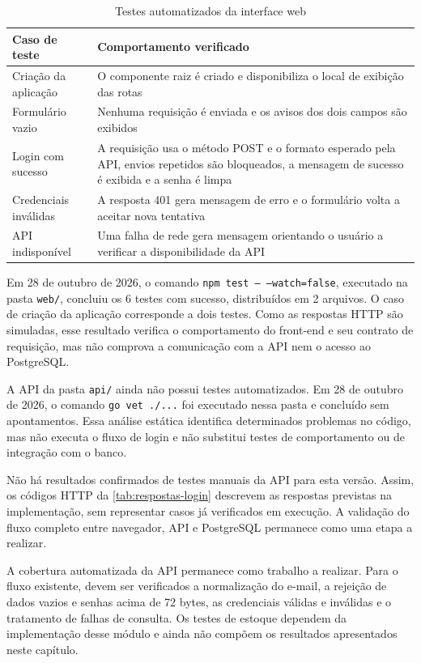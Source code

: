 \begin{table}[htbp]
  \centering
  \caption{Testes automatizados da interface web}
  \label{tab:testes-web}
  \begin{tabularx}{\textwidth}{XX}
    \toprule
    \textbf{Caso de teste} & \textbf{Comportamento verificado} \\
    \midrule
    Criação da aplicação & O componente raiz é criado e disponibiliza o local de exibição das rotas \\
    Formulário vazio & Nenhuma requisição é enviada e os avisos dos dois campos são exibidos \\
    Login com sucesso & A requisição usa o método POST e o formato esperado pela API, envios repetidos são bloqueados, a mensagem de sucesso é exibida e a senha é limpa \\
    Credenciais inválidas & A resposta 401 gera mensagem de erro e o formulário volta a aceitar nova tentativa \\
    API indisponível & Uma falha de rede gera mensagem orientando o usuário a verificar a disponibilidade da API \\
    \bottomrule
  \end{tabularx}
\end{table}

Em 28 de outubro de 2026, o comando \texttt{npm test -- --watch=false}, executado na pasta \texttt{web/}, concluiu os 6 testes com sucesso, distribuídos em 2 arquivos. O caso de criação da aplicação corresponde a dois testes. Como as respostas HTTP são simuladas, esse resultado verifica o comportamento do front-end e seu contrato de requisição, mas não comprova a comunicação com a API nem o acesso ao PostgreSQL.

A API da pasta \texttt{api/} ainda não possui testes automatizados. Em 28 de outubro de 2026, o comando \texttt{go vet ./...} foi executado nessa pasta e concluído sem apontamentos. Essa análise estática identifica determinados problemas no código, mas não executa o fluxo de login e não substitui testes de comportamento ou de integração com o banco.

Não há resultados confirmados de testes manuais da API para esta versão. Assim, os códigos HTTP da \autoref{tab:respostas-login} descrevem as respostas previstas na implementação, sem representar casos já verificados em execução. A validação do fluxo completo entre navegador, API e PostgreSQL permanece como uma etapa a realizar.

A cobertura automatizada da API permanece como trabalho a realizar. Para o fluxo existente, devem ser verificados a normalização do e-mail, a rejeição de dados vazios e senhas acima de 72 bytes, as credenciais válidas e inválidas e o tratamento de falhas de consulta. Os testes de estoque dependem da implementação desse módulo e ainda não compõem os resultados apresentados neste capítulo.

